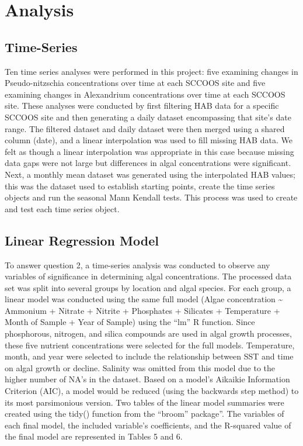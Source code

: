 \documentclass[
  12pt,
]{article}
\begin{document}
\newpage

\hypertarget{analysis}{%
\section{Analysis}\label{analysis}}

\hypertarget{time-series}{%
\subsection{Time-Series}\label{time-series}}

Ten time series analyses were performed in this project: five examining
changes in Pseudo-nitzschia concentrations over time at each SCCOOS site
and five examining changes in Alexandrium concentrations over time at
each SCCOOS site. These analyses were conducted by first filtering HAB
data for a specific SCCOOS site and then generating a daily dataset
encompassing that site's date range. The filtered dataset and daily
dataset were then merged using a shared column (date), and a linear
interpolation was used to fill missing HAB data. We felt as though a
linear interpolation was appropriate in this case because missing data
gaps were not large but differences in algal concentrations were
significant. Next, a monthly mean dataset was generated using the
interpolated HAB values; this was the dataset used to establish starting
points, create the time series objects and run the seasonal Mann Kendall
tests. This process was used to create and test each time series object.

\hypertarget{linear-regression-model}{%
\subsection{Linear Regression Model}\label{linear-regression-model}}

To answer question 2, a time-series analysis was conducted to observe
any variables of significance in determining algal concentrations. The
processed data set was split into several groups by location and algal
species. For each group, a linear model was conducted using the same
full model (Algae concentration \textasciitilde{} Ammonium + Nitrate +
Nitrite + Phosphates + Silicates + Temperature + Month of Sample + Year
of Sample) using the ``lm'' R function. Since phosphorous, nitrogen, and
silica compounds are used in algal growth processes, these five nutrient
concentrations were selected for the full models. Temperature, month,
and year were selected to include the relationship between SST and time
on algal growth or decline. Salinity was omitted from this model due to
the higher number of NA's in the dataset. Based on a model's Aikaikie
Information Criterion (AIC), a model would be reduced (using the
backwards step method) to its most parsimonious version. Two tables of
the linear model summaries were created using the tidy() function from
the ``broom'' package''. The variables of each final model, the included
variable's coefficients, and the R-squared value of the final model are
represented in Tables 5 and 6.
\end{document}
